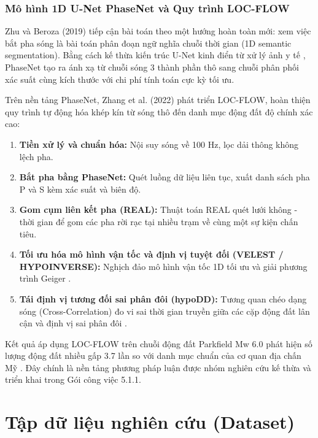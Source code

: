 \documentclass[preprint,1p]{elsarticle}
\begin{document}
\subsubsection{Mô hình 1D U-Net PhaseNet và Quy trình LOC-FLOW}
Zhu và Beroza (2019) \cite{zhu2019phasenet} tiếp cận bài toán theo một hướng hoàn toàn mới: xem việc bắt pha sóng là bài toán phân đoạn ngữ nghĩa chuỗi thời gian (1D semantic segmentation). Bằng cách kế thừa kiến trúc U-Net kinh điển từ xử lý ảnh y tế \cite{ronneberger2015u}, PhaseNet tạo ra ánh xạ từ chuỗi sóng 3 thành phần thô sang chuỗi phân phối xác suất cùng kích thước với chi phí tính toán cực kỳ tối ưu.

Trên nền tảng PhaseNet, Zhang et al. (2022) \cite{zhang2022locflow} phát triển LOC-FLOW, hoàn thiện quy trình tự động hóa khép kín từ sóng thô đến danh mục động đất độ chính xác cao:
\begin{enumerate}
    \item \textbf{Tiền xử lý và chuẩn hóa:} Nội suy sóng về 100 Hz, lọc dải thông không lệch pha.
    \item \textbf{Bắt pha bằng PhaseNet:} Quét luồng dữ liệu liên tục, xuất danh sách pha P và S kèm xác suất và biên độ.
    \item \textbf{Gom cụm liên kết pha (REAL):} Thuật toán REAL \cite{zhang2019rapid} quét lưới không - thời gian để gom các pha rời rạc tại nhiều trạm về cùng một sự kiện chấn tiêu.
    \item \textbf{Tối ưu hóa mô hình vận tốc và định vị tuyệt đối (VELEST / HYPOINVERSE):} Nghịch đảo mô hình vận tốc 1D tối ưu và giải phương trình Geiger \cite{klein2002user}.
    \item \textbf{Tái định vị tương đối sai phân đôi (hypoDD):} Tương quan chéo dạng sóng (Cross-Correlation) đo vi sai thời gian truyền giữa các cặp động đất lân cận và định vị sai phân đôi \cite{waldhauser2000double}.
\end{enumerate}
Kết quả áp dụng LOC-FLOW trên chuỗi động đất Parkfield Mw 6.0 phát hiện số lượng động đất nhiều gấp 3.7 lần so với danh mục chuẩn của cơ quan địa chấn Mỹ \cite{zhang2022locflow}. Đây chính là nền tảng phương pháp luận được nhóm nghiên cứu kế thừa và triển khai trong Gói công việc 5.1.1.

\section{Tập dữ liệu nghiên cứu (Dataset)}
\label{sec:dataset}
\end{document}
